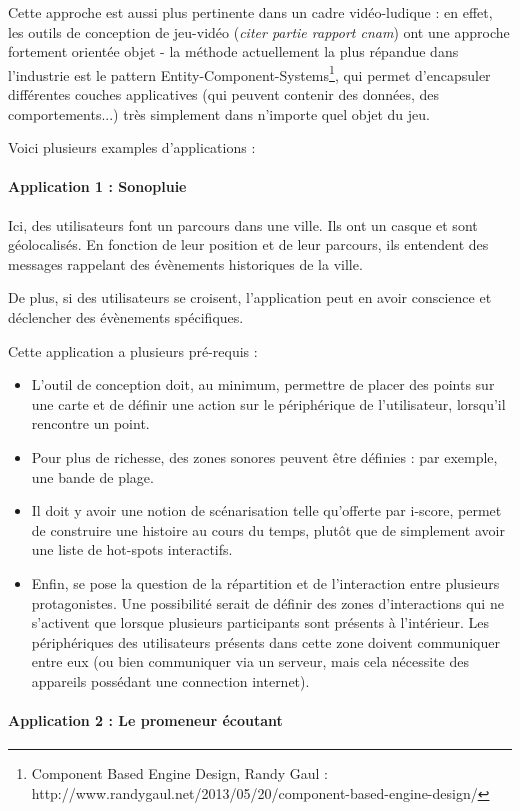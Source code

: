 \documentclass[french,12pt]{article}
\begin{document}
Cette approche est aussi plus pertinente dans un cadre vidéo-ludique : en effet, les outils de conception de jeu-vidéo (\textit{citer partie rapport cnam}) ont une approche fortement orientée objet - la méthode actuellement la plus répandue dans l'industrie est le pattern Entity-Component-Systems\footnote{Component Based Engine Design, Randy Gaul : http://www.randygaul.net/2013/05/20/component-based-engine-design/}, qui permet d'encapsuler différentes couches applicatives (qui peuvent contenir des données, des comportements...) très simplement dans n'importe quel objet du jeu.

Voici plusieurs examples d'applications :
\paragraph{Application 1 : Sonopluie}
Ici, des utilisateurs font un parcours dans une ville. Ils ont un casque et sont géolocalisés. En fonction de leur position et de leur parcours, ils entendent des messages rappelant des évènements historiques de la ville. 

De plus, si des utilisateurs se croisent, l'application peut en avoir conscience et déclencher des évènements spécifiques.

Cette application a plusieurs pré-requis : 
\begin{itemize}
\item L'outil de conception doit, au minimum, permettre de placer des points sur une carte et de définir une action sur le périphérique de l'utilisateur, lorsqu'il rencontre un point.
\item Pour plus de richesse, des zones sonores peuvent être définies : par exemple, une bande de plage.
\item Il doit y avoir une notion de scénarisation telle qu'offerte par i-score, permet de construire une histoire au cours du temps, plutôt que de simplement avoir une liste de hot-spots interactifs.
\item Enfin, se pose la question de la répartition et de l'interaction entre plusieurs protagonistes. Une possibilité serait de définir des zones d'interactions qui ne s'activent que lorsque plusieurs participants sont présents à l'intérieur. Les périphériques des utilisateurs présents dans cette zone doivent communiquer entre eux (ou bien communiquer via un serveur, mais cela nécessite des appareils possédant une connection internet).
\end{itemize}

\paragraph{Application 2 : Le promeneur écoutant}
\end{document}
